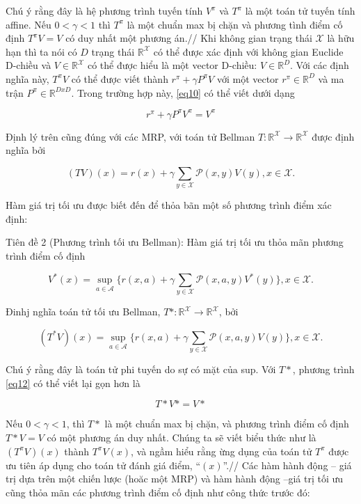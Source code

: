 \documentclass[14pt,a4paper,oneside]{report}		%
\begin{document}
Chú ý rằng đây là hệ phương trình tuyến tính $V^\pi$ và $T^\pi$ là một toán tử tuyến tính affine. Nếu $0<\gamma<1$ thì $T^\pi$ là một chuẩn max bị chặn và phương tình điểm cố định $T^\pi V = V$ có duy nhất một phương án.//
Khi không gian trạng thái $\mathcal{X}$ là hữu hạn thì ta nói có $D$ trạng thái $\mathbb{R}^\mathcal{X}$ có thể được xác định với không gian Euclide D-chiều và $V\in\mathbb{R}^\mathcal{X}$ có thể được hiểu là một vector D-chiều: $V\in\mathbb{R}^D$. Với các định nghĩa này, $T^\pi V$ có thể được viết thành $r^\pi+\gamma P^\pi V$ với một vector $r^\pi\in\mathbb{R}^D$ và ma trận $P^\pi\in\mathbb{R}^{DxD}$. Trong trường hợp này, \ref{eq10} có thể viết dưới dạng


\begin{equation} \label{eq11}
r^\pi+\gamma P^\pi V^\pi=V^\pi
\end{equation}

Định lý trên cũng đúng với các MRP, với toán tử Bellman $T:\mathbb{R}^\mathcal{X}\rightarrow\mathbb{R}^\mathcal{X}$ được định nghĩa bởi

$$(TV)(x) = r(x) + \gamma \displaystyle\sum_{y\in\mathcal{X}}{\mathcal{P}(x,y)V(y)}, x\in\mathcal{X}.$$

Hàm giá trị tối ưu được biết đến để thỏa bãn một số phương trình điểm xác định:

Tiên đề 2 (Phương trình tối ưu Bellman): Hàm giá trị tối ưu thỏa mãn phương trình điểm cố định

\begin{equation} \label{eq12}
V^*(x)=\sup_{a\in\mathcal{A}}\bigg\{ r(x,a) + \gamma \displaystyle\sum_{y\in\mathcal{X}}{\mathcal{P}(x,a,y)V^*(y)}\bigg\} , x\in\mathcal{X}.
\end{equation}

Đinhj nghĩa toán tử tối ưu Bellman, $T*:\mathbb{R}^\mathcal{X}\rightarrow\mathbb{R}^\mathcal{X}$, bởi

\begin{equation} \label{eq13}
(T^*V)(x)=\sup_{a\in\mathcal{A}}\bigg\{ r(x,a) + \gamma \displaystyle\sum_{y\in\mathcal{X}}{\mathcal{P}(x,a,y)V(y)}\bigg\} , x\in\mathcal{X}.
\end{equation}

Chú ý rằng đây là toán tử phi tuyến do sự có mặt của sup. Với $T*$, phương trình \ref{eq12} có thể viết lại gọn hơn là 

$$T*V*=V*$$

Nếu $0<\gamma<1$, thì $T*$ là một chuẩn max bị chặn, và phương trình điểm cố định $T*V=V$ có một phương án duy nhất.
Chúng ta sẽ viết biểu thức như là $(T^\pi V)(x)$ thành $T^\pi V(x)$, và ngầm hiểu rằng ừng dụng của toán tử $T^\pi$ được ưu tiên áp dụng cho toán tử đánh giá điểm, “$(x)$”.//
Các hàm hành động – giá trị dựa trên một chiến lược (hoăc một MRP) và hàm hành động –giá trị tối ưu cũng thỏa mãn các phương trình điểm cố định như công thức trước đó:
\end{document}
